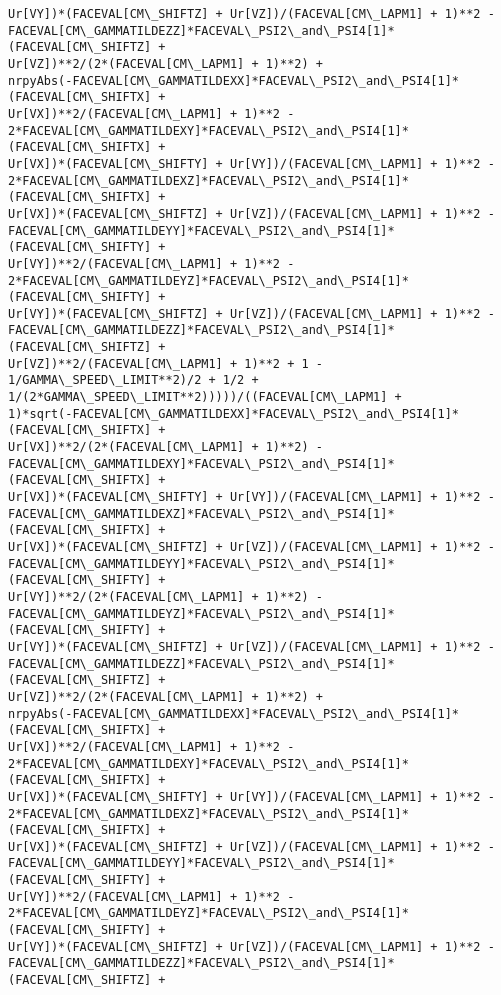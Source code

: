 \documentclass[landscape,letterpaper,10pt,english]{article}
\begin{document}
\begin{Verbatim}[commandchars=\\\{\}]
Ur[VY])*(FACEVAL[CM\_SHIFTZ] + Ur[VZ])/(FACEVAL[CM\_LAPM1] + 1)**2 -
FACEVAL[CM\_GAMMATILDEZZ]*FACEVAL\_PSI2\_and\_PSI4[1]*(FACEVAL[CM\_SHIFTZ] +
Ur[VZ])**2/(2*(FACEVAL[CM\_LAPM1] + 1)**2) +
nrpyAbs(-FACEVAL[CM\_GAMMATILDEXX]*FACEVAL\_PSI2\_and\_PSI4[1]*(FACEVAL[CM\_SHIFTX] +
Ur[VX])**2/(FACEVAL[CM\_LAPM1] + 1)**2 -
2*FACEVAL[CM\_GAMMATILDEXY]*FACEVAL\_PSI2\_and\_PSI4[1]*(FACEVAL[CM\_SHIFTX] +
Ur[VX])*(FACEVAL[CM\_SHIFTY] + Ur[VY])/(FACEVAL[CM\_LAPM1] + 1)**2 -
2*FACEVAL[CM\_GAMMATILDEXZ]*FACEVAL\_PSI2\_and\_PSI4[1]*(FACEVAL[CM\_SHIFTX] +
Ur[VX])*(FACEVAL[CM\_SHIFTZ] + Ur[VZ])/(FACEVAL[CM\_LAPM1] + 1)**2 -
FACEVAL[CM\_GAMMATILDEYY]*FACEVAL\_PSI2\_and\_PSI4[1]*(FACEVAL[CM\_SHIFTY] +
Ur[VY])**2/(FACEVAL[CM\_LAPM1] + 1)**2 -
2*FACEVAL[CM\_GAMMATILDEYZ]*FACEVAL\_PSI2\_and\_PSI4[1]*(FACEVAL[CM\_SHIFTY] +
Ur[VY])*(FACEVAL[CM\_SHIFTZ] + Ur[VZ])/(FACEVAL[CM\_LAPM1] + 1)**2 -
FACEVAL[CM\_GAMMATILDEZZ]*FACEVAL\_PSI2\_and\_PSI4[1]*(FACEVAL[CM\_SHIFTZ] +
Ur[VZ])**2/(FACEVAL[CM\_LAPM1] + 1)**2 + 1 - 1/GAMMA\_SPEED\_LIMIT**2)/2 + 1/2 +
1/(2*GAMMA\_SPEED\_LIMIT**2)))))/((FACEVAL[CM\_LAPM1] +
1)*sqrt(-FACEVAL[CM\_GAMMATILDEXX]*FACEVAL\_PSI2\_and\_PSI4[1]*(FACEVAL[CM\_SHIFTX] +
Ur[VX])**2/(2*(FACEVAL[CM\_LAPM1] + 1)**2) -
FACEVAL[CM\_GAMMATILDEXY]*FACEVAL\_PSI2\_and\_PSI4[1]*(FACEVAL[CM\_SHIFTX] +
Ur[VX])*(FACEVAL[CM\_SHIFTY] + Ur[VY])/(FACEVAL[CM\_LAPM1] + 1)**2 -
FACEVAL[CM\_GAMMATILDEXZ]*FACEVAL\_PSI2\_and\_PSI4[1]*(FACEVAL[CM\_SHIFTX] +
Ur[VX])*(FACEVAL[CM\_SHIFTZ] + Ur[VZ])/(FACEVAL[CM\_LAPM1] + 1)**2 -
FACEVAL[CM\_GAMMATILDEYY]*FACEVAL\_PSI2\_and\_PSI4[1]*(FACEVAL[CM\_SHIFTY] +
Ur[VY])**2/(2*(FACEVAL[CM\_LAPM1] + 1)**2) -
FACEVAL[CM\_GAMMATILDEYZ]*FACEVAL\_PSI2\_and\_PSI4[1]*(FACEVAL[CM\_SHIFTY] +
Ur[VY])*(FACEVAL[CM\_SHIFTZ] + Ur[VZ])/(FACEVAL[CM\_LAPM1] + 1)**2 -
FACEVAL[CM\_GAMMATILDEZZ]*FACEVAL\_PSI2\_and\_PSI4[1]*(FACEVAL[CM\_SHIFTZ] +
Ur[VZ])**2/(2*(FACEVAL[CM\_LAPM1] + 1)**2) +
nrpyAbs(-FACEVAL[CM\_GAMMATILDEXX]*FACEVAL\_PSI2\_and\_PSI4[1]*(FACEVAL[CM\_SHIFTX] +
Ur[VX])**2/(FACEVAL[CM\_LAPM1] + 1)**2 -
2*FACEVAL[CM\_GAMMATILDEXY]*FACEVAL\_PSI2\_and\_PSI4[1]*(FACEVAL[CM\_SHIFTX] +
Ur[VX])*(FACEVAL[CM\_SHIFTY] + Ur[VY])/(FACEVAL[CM\_LAPM1] + 1)**2 -
2*FACEVAL[CM\_GAMMATILDEXZ]*FACEVAL\_PSI2\_and\_PSI4[1]*(FACEVAL[CM\_SHIFTX] +
Ur[VX])*(FACEVAL[CM\_SHIFTZ] + Ur[VZ])/(FACEVAL[CM\_LAPM1] + 1)**2 -
FACEVAL[CM\_GAMMATILDEYY]*FACEVAL\_PSI2\_and\_PSI4[1]*(FACEVAL[CM\_SHIFTY] +
Ur[VY])**2/(FACEVAL[CM\_LAPM1] + 1)**2 -
2*FACEVAL[CM\_GAMMATILDEYZ]*FACEVAL\_PSI2\_and\_PSI4[1]*(FACEVAL[CM\_SHIFTY] +
Ur[VY])*(FACEVAL[CM\_SHIFTZ] + Ur[VZ])/(FACEVAL[CM\_LAPM1] + 1)**2 -
FACEVAL[CM\_GAMMATILDEZZ]*FACEVAL\_PSI2\_and\_PSI4[1]*(FACEVAL[CM\_SHIFTZ] +

\end{Verbatim}
\end{document}
